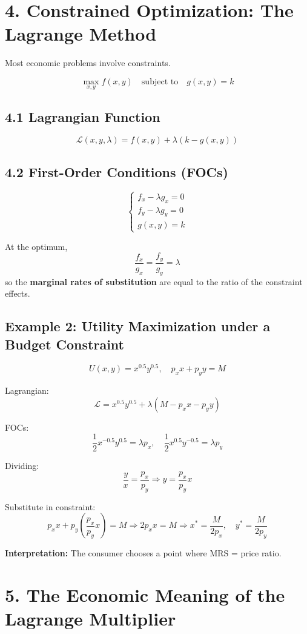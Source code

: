 \documentclass[12pt]{article}
\begin{document}
\section*{4. Constrained Optimization: The Lagrange Method}

Most economic problems involve constraints.

\[
\max_{x,y} f(x,y) \quad \text{subject to} \quad g(x,y) = k
\]

\subsection*{4.1 Lagrangian Function}
\[
\mathcal{L}(x,y,\lambda) = f(x,y) + \lambda(k - g(x,y))
\]

\subsection*{4.2 First-Order Conditions (FOCs)}
\[
\begin{cases}
f_x - \lambda g_x = 0 \\
f_y - \lambda g_y = 0 \\
g(x,y) = k
\end{cases}
\]

At the optimum,
\[
\frac{f_x}{g_x} = \frac{f_y}{g_y} = \lambda
\]
so the \textbf{marginal rates of substitution} are equal to the ratio of the constraint effects.



\subsection*{Example 2: Utility Maximization under a Budget Constraint}

\[
U(x,y) = x^{0.5}y^{0.5}, \quad p_xx + p_yy = M
\]

Lagrangian:
\[
\mathcal{L} = x^{0.5}y^{0.5} + \lambda(M - p_xx - p_yy)
\]

FOCs:
\[
\frac{1}{2}x^{-0.5}y^{0.5} = \lambda p_x, \quad
\frac{1}{2}x^{0.5}y^{-0.5} = \lambda p_y
\]

Dividing:
\[
\frac{y}{x} = \frac{p_x}{p_y} \Rightarrow y = \frac{p_x}{p_y}x
\]

Substitute in constraint:
\[
p_xx + p_y\left(\frac{p_x}{p_y}x\right) = M \Rightarrow 2p_xx = M \Rightarrow x^* = \frac{M}{2p_x}, \quad y^* = \frac{M}{2p_y}
\]

\textbf{Interpretation:} The consumer chooses a point where MRS = price ratio.


\section*{5. The Economic Meaning of the Lagrange Multiplier}
\end{document}
